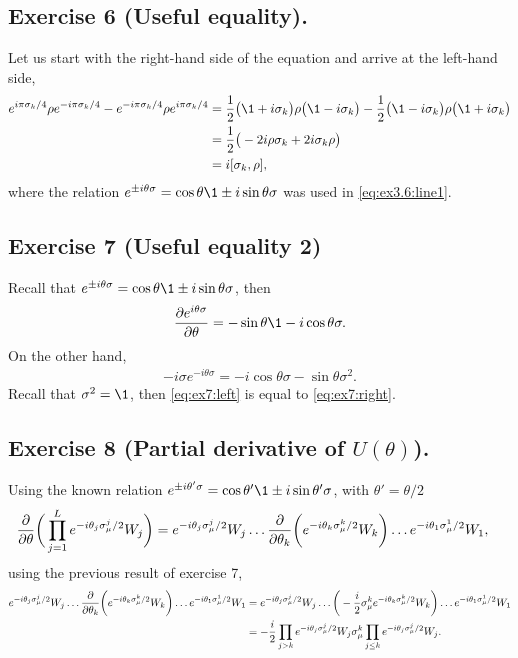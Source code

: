 \subsection{Exercise 6 (Useful equality).}\noindent
Let us start with the right-hand side of the equation and arrive at the left-hand side,
\begin{subequations}
\begin{align}
\label{eq:ex3.6:line1}
e^{i\pi \sigma_k/4}\rho e^{-i\pi \sigma_k/4}-
	e^{-i\pi \sigma_k/4}\rho e^{i\pi \sigma_k/4}&=
		\frac{1}{2}\big(\1+i\sigma_k \big)\rho\big(\1-i\sigma_k \big)-
			\frac{1}{2}\big(\1-i\sigma_k \big)\rho\big(\1+i\sigma_k \big)\\
&=\frac{1}{2}\big( -2i\rho\sigma_k+2i\sigma_k\rho \big)\\
&=i\comm{\sigma_k}{\rho},
\end{align}
\end{subequations}
where the relation $e^{\pm i\theta\sigma}=\cos \theta\1\pm i\sin\theta\sigma$
was used in \eqref{eq:ex3.6:line1}.

\subsection{Exercise 7 (Useful equality 2)}\noindent
Recall that $e^{\pm i\theta\sigma}=\cos \theta\1\pm i\sin\theta\sigma$, then 
\begin{align}\label{eq:ex7:left}
\pdv{e^{i\theta\sigma}}{\theta}=-\sin\theta\1-i\cos\theta\sigma.
\end{align}
On the other hand, 
\begin{align}\label{eq:ex7:right}
-i\sigma e^{-i\theta\sigma}=-i\cos\theta\sigma-\sin\theta\sigma^2.
\end{align}
Recall that $\sigma^2=\1$, then \eqref{eq:ex7:left} is equal to \eqref{eq:ex7:right}.

\subsection{Exercise 8 (Partial derivative of $U(\theta)$).}
Using the known relation $e^{\pm i\theta'\sigma}=\cos \theta'\1\pm i\sin\theta'\sigma$,
with $\theta'=\theta/2$
\begin{align}
\pdv{\theta}\bigg( \prod_{j=1}^Le^{-i\theta_j\sigma_{\mu}^j/2}W_j \bigg)&=
	e^{-i\theta_j\sigma_{\mu}^j/2}W_j\ldots 
		\pdv{\theta_k}\bigg( e^{-i\theta_k\sigma_{\mu}^k/2}W_k \bigg)
		\ldots e^{-i\theta_1\sigma_{\mu}^1/2}W_1,
\end{align}
using the previous result of exercise 7,
\begin{subequations}
\begin{align}
e^{-i\theta_j\sigma_{\mu}^j/2}W_j\ldots 
	\pdv{\theta_k}\bigg( e^{-i\theta_k\sigma_{\mu}^k/2}W_k \bigg)
		\ldots e^{-i\theta_1\sigma_{\mu}^1/2}W_1&=
			e^{-i\theta_j\sigma_{\mu}^j/2}W_j\ldots 
				\bigg( -\frac{i}{2}\sigma_{\mu}^ke^{-i\theta_k\sigma_{\mu}^k/2}W_k \bigg)
					\ldots e^{-i\theta_1\sigma_{\mu}^1/2}W_1\\
&=-\frac{i}{2}\prod_{j>k}e^{-i\theta_j\sigma_{\mu}^j/2}W_j\sigma_{\mu}^k
	\prod_{j\le k}e^{-i\theta_j\sigma_{\mu}^j/2}W_j.
\end{align}
\end{subequations}
